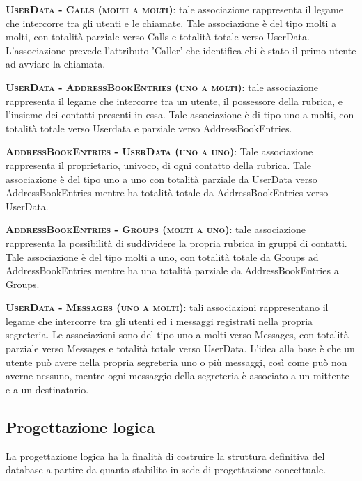 \begin{description}
	\item{\scshape\bfseries UserData - Calls (molti a molti)}: tale associazione rappresenta il legame che intercorre tra gli utenti e le chiamate. Tale associazione è del tipo molti a molti, con totalità parziale verso Calls e totalità totale verso UserData. L'associazione prevede l'attributo 'Caller' che identifica chi è stato il primo utente ad avviare la chiamata.
	
	\item{\scshape\bfseries UserData - AddressBookEntries (uno a molti)}: tale associazione rappresenta il legame che intercorre tra un utente, il possessore della rubrica, e l'insieme dei contatti presenti in essa. Tale associazione è di tipo uno a molti, con totalità totale verso Userdata e parziale verso AddressBookEntries.
	
	\item{\scshape\bfseries AddressBookEntries - UserData (uno a uno)}: Tale associazione rappresenta il proprietario, univoco, di ogni contatto della rubrica. Tale associazione è del tipo uno a uno con totalità parziale da UserData verso AddressBookEntries mentre ha totalità totale da AddressBookEntries verso UserData.
	
	\item{\scshape\bfseries AddressBookEntries - Groups (molti a uno)}: tale associazione rappresenta la possibilità di suddividere la propria rubrica in gruppi di contatti. Tale associazione è del tipo molti a uno, con totalità totale da Groups ad AddressBookEntries mentre ha una totalità parziale da AddressBookEntries a Groups.
	
	\item{\scshape\bfseries UserData - Messages (uno a molti)}: tali associazioni rappresentano il legame che intercorre tra gli utenti ed i messaggi registrati nella propria segreteria. Le associazioni sono del tipo uno a molti verso Messages, con totalità parziale verso Messages e totalità totale verso UserData. L'idea alla base è che un utente può avere nella propria segreteria uno o più messaggi, così come può non averne nessuno, mentre ogni messaggio della segreteria è associato a un mittente e a un destinatario.
\end{description}

\subsection{Progettazione logica}
La progettazione logica ha la finalità di costruire la struttura definitiva del database a partire da quanto stabilito in sede di progettazione concettuale.


